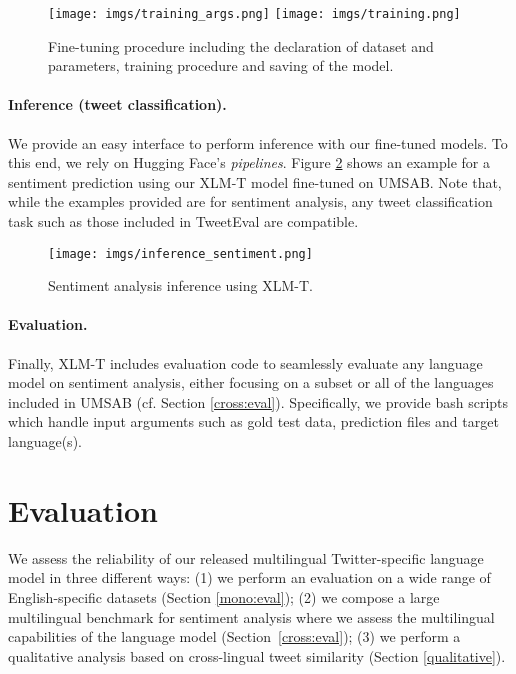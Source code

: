 \documentclass[10pt, a4paper]{article}
\begin{document}
        \begin{figure}[t]
\texttt{[image: imgs/training\_args.png]}
\texttt{[image: imgs/training.png]}
\caption{\label{fig:finetuning} Fine-tuning procedure including the declaration of dataset and parameters, training procedure and saving of the model.}
\end{figure}
    
    
    
    
\paragraph{Inference (tweet classification).} We provide an easy interface to perform inference with our fine-tuned models. To this end, we rely on Hugging Face's \textit{pipelines}. Figure \ref{fig:codeinference} shows an example for a sentiment prediction using our XLM-T model fine-tuned on UMSAB. Note that, while the examples provided are for sentiment analysis, any tweet classification task such as those included in TweetEval are compatible.
    
    \begin{figure}[t]
\texttt{[image: imgs/inference\_sentiment.png]}
\caption{\label{fig:codeinference} Sentiment analysis inference using XLM-T.}
\end{figure}
    
\paragraph{Evaluation.} Finally, XLM-T includes evaluation code to seamlessly evaluate any language model on sentiment analysis, either focusing on a subset or all of the languages included in UMSAB (cf. Section \ref{cross:eval}). Specifically, we provide bash scripts which handle input arguments such as gold test data, prediction files and target language(s). 





\section{Evaluation}

We assess the reliability of our released multilingual Twitter-specific language model in three different ways: (1) we perform an evaluation on a wide range of English-specific datasets (Section \ref{mono:eval}); (2) we compose a large multilingual benchmark for sentiment analysis where we assess the multilingual capabilities of the language model (Section~\ref{cross:eval}); (3) we perform a qualitative analysis based on cross-lingual tweet similarity (Section \ref{qualitative}).
\end{document}
